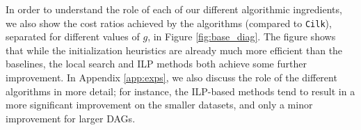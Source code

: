 \documentclass[sigconf,nonacm]{acmart}
\begin{document}
In order to understand the role of each of our different algorithmic ingredients, we also show the cost ratios achieved by the algorithms (compared to \texttt{Cilk}), separated for different values of $g$, in Figure \ref{fig:base_diag}. The figure shows that while the initialization heuristics are already much more efficient than the baselines, the local search and ILP methods both achieve some further improvement. In Appendix \ref{app:exps}, we also discuss the role of the different algorithms in more detail; for instance, the ILP-based methods tend to result in a more significant improvement on the smaller datasets, and only a minor improvement for larger DAGs.

\begin{figure*}[ht]
    \centering
  \begin{minipage}[b]{0.3\textwidth}
  \end{minipage}
  \hspace{0.02\textwidth}
    \begin{minipage}[b]{0.3\textwidth}

\end{minipage}
\end{figure*}
\end{document}
